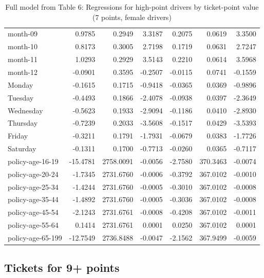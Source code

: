 \documentclass[10pt]{article}
\begin{document}
\begin{table}[ht]
\begin{tabular}{lrrrrrr}
  month-09 & 0.9785 & 0.2949 & 3.3187 & 0.2075 & 0.0619 & 3.3500 \\ 
  month-10 & 0.8173 & 0.3005 & 2.7198 & 0.1719 & 0.0631 & 2.7247 \\ 
  month-11 & 1.0293 & 0.2929 & 3.5143 & 0.2210 & 0.0614 & 3.5968 \\ 
  month-12 & -0.0901 & 0.3595 & -0.2507 & -0.0115 & 0.0741 & -0.1559 \\ 
  Monday & -0.1615 & 0.1715 & -0.9418 & -0.0365 & 0.0369 & -0.9896 \\ 
  Tuesday & -0.4493 & 0.1866 & -2.4078 & -0.0938 & 0.0397 & -2.3649 \\ 
  Wednesday & -0.5623 & 0.1933 & -2.9094 & -0.1186 & 0.0410 & -2.8930 \\ 
  Thursday & -0.7239 & 0.2033 & -3.5608 & -0.1517 & 0.0429 & -3.5393 \\ 
  Friday & -0.3211 & 0.1791 & -1.7931 & -0.0679 & 0.0383 & -1.7726 \\ 
  Saturday & -0.1311 & 0.1700 & -0.7713 & -0.0260 & 0.0365 & -0.7117 \\ 
  policy-age-16-19 & -15.4781 & 2758.0091 & -0.0056 & -2.7580 & 370.3463 & -0.0074 \\ 
  policy-age-20-24 & -1.7345 & 2731.6760 & -0.0006 & -0.3792 & 367.0102 & -0.0010 \\ 
  policy-age-25-34 & -1.4244 & 2731.6760 & -0.0005 & -0.3010 & 367.0102 & -0.0008 \\ 
  policy-age-35-44 & -1.4892 & 2731.6760 & -0.0005 & -0.3036 & 367.0102 & -0.0008 \\ 
  policy-age-45-54 & -2.1243 & 2731.6761 & -0.0008 & -0.4208 & 367.0102 & -0.0011 \\ 
  policy-age-55-64 & 0.1414 & 2731.6761 & 0.0001 & 0.0250 & 367.0102 & 0.0001 \\ 
  policy-age-65-199 & -12.7549 & 2736.8488 & -0.0047 & -2.1562 & 367.9499 & -0.0059 \\ 
   \hline
\end{tabular}
\caption{Full model from Table 6: Regressions for high-point drivers by ticket-point value (7 points, female drivers)} 
\label{tab_6_7_pts_F}
\end{table}


\clearpage
\pagebreak




\subsection{Tickets for 9+ points}
\end{document}
